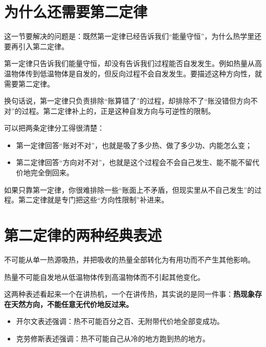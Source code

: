 \documentclass[lang=cn,11pt]{elegantbook}
\newcommand{\bridge}[1]{\begin{note}#1\end{note}}
\begin{document}
\section{为什么还需要第二定律}

这一节要解决的问题是：既然第一定律已经告诉我们“能量守恒”，为什么热学里还要再引入第二定律。

第一定律只告诉我们能量守恒，却没有告诉我们过程能否自发发生。例如热量从高温物体传到低温物体是自发的，但反向过程不会自发发生。要描述这种方向性，就需要第二定律。

\bridge{换句话说，第一定律只负责排除“账算错了”的过程，却排除不了“账没错但方向不对”的过程。第二定律补上的，正是这种自发方向与可逆性的限制。}

可以把两条定律分工得很清楚：
\begin{itemize}
 \item 第一定律回答“账对不对”，也就是吸了多少热、做了多少功、内能怎么变；
 \item 第二定律回答“方向对不对”，也就是这个过程会不会自己发生、能不能不留代价地完全倒回来。
\end{itemize}

\begin{remark}
如果只靠第一定律，你很难排除一些“账面上不矛盾，但现实里从不自己发生”的过程。第二定律就是专门把这些“方向性限制”补进来。
\end{remark}

\section{第二定律的两种经典表述}

\begin{theorem}[开尔文表述]\label{thm:kelvin-statement}
不可能从单一热源吸热，并把吸收的热量全部转化为有用功而不产生其他影响。
\end{theorem}

\begin{theorem}[克劳修斯表述]\label{thm:clausius-statement}
热量不可能自发地从低温物体传到高温物体而不引起其他变化。
\end{theorem}

这两种表述看起来一个在讲热机，一个在讲传热，其实说的是同一件事：\textbf{热现象存在天然方向，不能任意无代价地反过来。}

\begin{itemize}
 \item 开尔文表述强调：热不可能百分之百、无附带代价地全部变成功。
 \item 克劳修斯表述强调：热不可能自己从冷的地方跑到热的地方。
\end{itemize}
\end{document}
